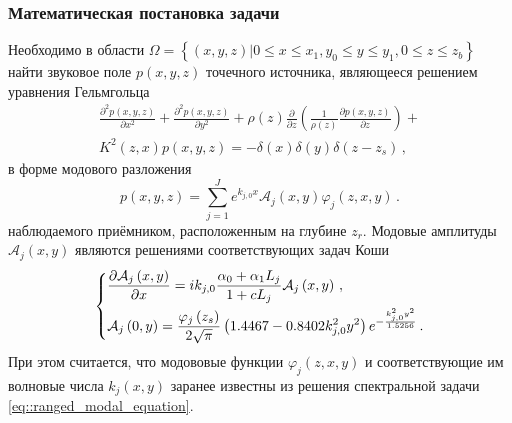 \documentclass{fefu}
\newcommand{\pa}[1]{\left(#1\right)}
\begin{document}
            \subsubsection{Математическая постановка задачи\label{sec::MPD}}
                \par Необходимо в области $\Omega=\left\{\pa{x,y,z}\big|0\leqslant x\leqslant x_1,y_0\leqslant y\leqslant y_1,0\leqslant z\leqslant z_b\right\}$ найти звуковое поле $p\pa{x,y,z}$ точечного источника, являющееся решением уравнения Гельмгольца
                \begin{multline}
                    \frac{\partial^2p\pa{x,y,z}}{\partial x^2}+\frac{\partial^2p\pa{x,y,z}}{\partial y^2}+\rho\pa{z}\frac{\partial}{\partial z}\pa{\frac{1}{\rho\pa{z}}\frac{\partial p\pa{x,y,z}}{\partial z}}+\\
                    K^2\pa{z,x}p\pa{x,y,z}=-\delta\pa{x}\delta\pa{y}\delta\pa{z-z_s}\,,
                \end{multline}
                в форме модового разложения
                \begin{equation}
                    p\pa{x,y,z}=\sum\limits_{j=1}^Je^{k_{j,0}x}\mathcal{A}_j\pa{x,y}\varphi_j\pa{z,x,y}\,.
                \end{equation}
                наблюдаемого приёмником, расположенным на глубине $z_r$. Модовые амплитуды $\mathcal{A}_j\pa{x,y}$ являются решениями соответствующих задач Коши
                \begin{equation}\label{eq::WAMPE_problem}
                    \begin{dcases}
                        \frac{\partial\mathcal{A}_j\pa{x,y}}{\partial x}=ik_{j,0}\frac{\alpha_0+\alpha_1L_j}{1+cL_j}\mathcal{A}_j\pa{x,y}\,,\\
                        \mathcal{A}_j\pa{0,y}=\frac{\varphi_j\pa{z_s}}{2\sqrt{\pi}}\pa{1.4467-0.8402k_{j,0}^2y^2}e^{-\frac{k_{j,0}^2y^2}{1.5256}}\,.
                    \end{dcases}
                \end{equation}
                При этом считается, что модововые функции $\varphi_j\pa{z,x,y}$ и соответствующие им волновые числа $k_j\pa{x,y}$ заранее известны из решения спектральной задачи \eqref{eq::ranged_modal_equation}.
\end{document}

